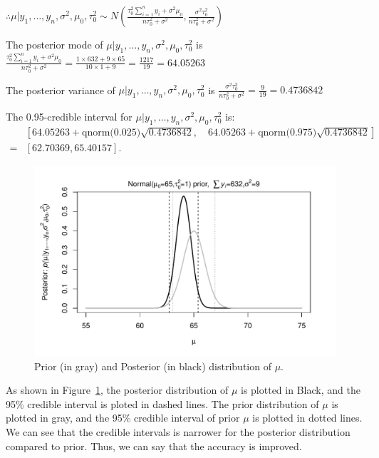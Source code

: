 \documentclass[11pt]{article}
\begin{document}
$\therefore \mu|y_1,\ldots,y_n, \sigma^2, \mu_0, \tau_0^2 \sim N(\frac{ \tau_0^2 \sum_{i=1}^{n} y_i + \sigma^2\mu_0 }{n\tau_0^2+\sigma^2}, \frac{\sigma^2\tau_0^2}{n\tau_0^2+\sigma^2})$

The posterior mode of $\mu|y_1,\ldots,y_n, \sigma^2, \mu_0, \tau_0^2$ is $\frac{ \tau_0^2 \sum_{i=1}^{n} y_i + \sigma^2\mu_0 }{n\tau_0^2+\sigma^2} = \frac{1\times632+9\times 65}{10\times 1+9} = \frac{1217}{19} = 64.05263$

The posterior variance of $\mu|y_1,\ldots,y_n, \sigma^2, \mu_0, \tau_0^2$ is $\frac{\sigma^2\tau_0^2}{n\tau_0^2+\sigma^2} = \frac{9}{19} = 0.4736842$ 

The 0.95-credible interval for $\mu|y_1,\ldots,y_n, \sigma^2, \mu_0, \tau_0^2$ is:
\begin{align*}
&[64.05263+\text{qnorm(0.025)}\sqrt{0.4736842}, \quad 64.05263+\text{qnorm(0.975)}\sqrt{0.4736842} ] \\
=& [62.70369, 65.40157]
.\end{align*}

\begin{figure}[htpb]
	\centering
	\includegraphics[width=\textwidth]{Ast3-Q3.pdf}
	\caption{Prior (in gray) and Posterior (in black) distribution of $\mu$.}
	\label{fig:Ast3-Q3-pdf}
\end{figure}

As shown in Figure~\ref{fig:Ast3-Q3-pdf}, the posterior distribution of $\mu$ is plotted in Black, and the 95\% credible interval is ploted in dashed lines. The prior distribution of $\mu$ is plotted in gray, and the 95\% credible interval of prior $\mu$ is plotted in dotted lines. We can see that the credible intervals is narrower for the posterior distribution compared to prior. Thus, we can say that the accuracy is improved.
\end{document}
